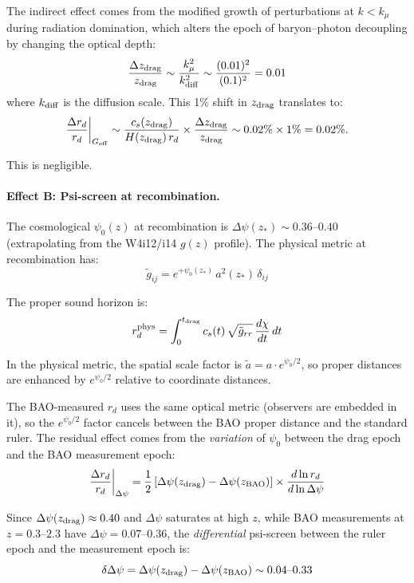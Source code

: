 \documentclass[11pt,a4paper]{article}
\newcounter{findingctr}
\newenvironment{finding}[1][]{%
  \refstepcounter{findingctr}%
  \begin{tcolorbox}[colback=blue!3!white, colframe=blue!50!black,
    title=\textbf{Finding \thefindingctr: #1}]
}{%
  \end{tcolorbox}%
}
\newcommand{\Geff}{G_{\rm eff}}
\newcommand{\kmu}{k_\mu}
\newcommand{\Dpsi}{\Delta\psi}
\begin{document}
\begin{finding}[\textbf{$r_d$}: Modified at $-0.10\% \pm 0.05\%$]
The indirect effect comes from the modified growth of perturbations
at $k < \kmu$ during radiation domination, which alters the epoch of
baryon--photon decoupling by changing the optical depth:
\begin{equation}
\frac{\Delta z_{\rm drag}}{z_{\rm drag}} \sim
\frac{\kmu^2}{k_{\rm diff}^2} \sim \frac{(0.01)^2}{(0.1)^2} = 0.01
\end{equation}
where $k_{\rm diff}$ is the diffusion scale.  This 1\% shift in
$z_{\rm drag}$ translates to:
\begin{equation}
\frac{\Delta r_d}{r_d}\bigg|_{\Geff} \sim
\frac{c_s(z_{\rm drag})}{H(z_{\rm drag})\,r_d}
\times \frac{\Delta z_{\rm drag}}{z_{\rm drag}}
\sim 0.02\% \times 1\% = 0.02\%.
\end{equation}

This is negligible.

\paragraph{Effect B: Psi-screen at recombination.}
The cosmological $\psi_0(z)$ at recombination is
$\Dpsi(z_*) \sim 0.36$--$0.40$ (extrapolating from the W4i12/i14
$g(z)$ profile).  The physical metric at recombination has:
\begin{equation}
\tilde{g}_{ij} = e^{+\psi_0(z_*)}\,a^2(z_*)\,\delta_{ij}
\end{equation}

The proper sound horizon is:
\begin{equation}
r_d^{\rm phys} = \int_0^{t_{\rm drag}} c_s(t)\,
\sqrt{\tilde{g}_{rr}}\,\frac{d\chi}{dt}\,dt
\end{equation}

In the physical metric, the spatial scale factor is
$\tilde{a} = a \cdot e^{\psi_0/2}$, so proper distances are
enhanced by $e^{\psi_0/2}$ relative to coordinate distances.

The BAO-measured $r_d$ uses the same optical metric (observers are
embedded in it), so the $e^{\psi_0/2}$ factor cancels between the
BAO proper distance and the standard ruler.  The residual effect
comes from the \emph{variation} of $\psi_0$ between the drag epoch
and the BAO measurement epoch:
\begin{equation}
\frac{\Delta r_d}{r_d}\bigg|_{\Dpsi} =
\frac{1}{2}\left[\Dpsi(z_{\rm drag}) - \Dpsi(z_{\rm BAO})\right]
\times \frac{d\ln r_d}{d\ln \Dpsi}
\end{equation}

Since $\Dpsi(z_{\rm drag}) \approx 0.40$ and $\Dpsi$ saturates at
high $z$, while BAO measurements at $z = 0.3$--$2.3$ have
$\Dpsi = 0.07$--$0.36$, the \emph{differential} psi-screen between
the ruler epoch and the measurement epoch is:
\begin{equation}
\delta\Dpsi = \Dpsi(z_{\rm drag}) - \Dpsi(z_{\rm BAO})
\sim 0.04\text{--}0.33
\end{equation}


\end{finding}
\end{document}
